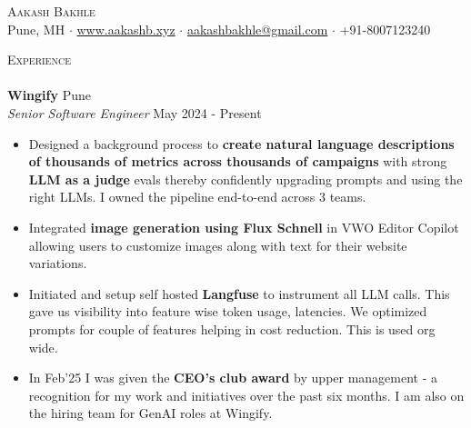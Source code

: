 \documentclass[a4paper]{article}
\newcommand{\lineunder} {
    \vspace*{-8pt} \\
    \hspace*{-18pt} \hrulefill \\
}
\newcommand{\header} [1] {
    {\hspace*{-18pt}\vspace*{6pt} \textsc{#1}}
    \vspace*{-6pt} \lineunder
}
\begin{document}
\vspace*{-40pt}



\vspace*{-10pt}
\begin{center}
    {\Huge \scshape {Aakash Bakhle}}\\
    Pune, MH $\cdot$ \href{https://www.aakashb.xyz}{www.aakashb.xyz} $\cdot$ \href{mailto:aakashbakhle@gmail.com}{aakashbakhle@gmail.com} $\cdot$ +91-8007123240 
\end{center}


\header{Experience}
\vspace{1mm}
\textbf{Wingify} \hfill Pune\\
\textit{Senior Software Engineer} \hfill May 2024 - Present\\
\vspace{-1mm}
\begin{itemize} \itemsep 1pt
    \item Designed a background process to \textbf{create natural language descriptions of thousands of metrics across thousands of campaigns} with strong \textbf{LLM as a judge} evals thereby confidently upgrading prompts and using the right LLMs. I owned the pipeline end-to-end across 3 teams.
    \item Integrated \textbf{image generation using Flux Schnell} in VWO Editor Copilot allowing users to customize images along with text for their website variations.
    \item Initiated and setup self hosted \textbf{Langfuse} to instrument all LLM calls. This gave us visibility into feature wise token usage, latencies. We optimized prompts for couple of features helping in cost reduction. This is used org wide.
    \item In Feb'25 I was given the \textbf{CEO's club award} by upper management - a recognition for my work and initiatives over the past six months. I am also on the hiring team for GenAI roles at Wingify.
\end{itemize}
\end{document}
